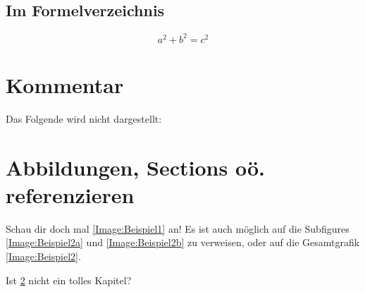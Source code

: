 \subsection{Im Formelverzeichnis}
\begin{equation}
	a^2+b^2=c^2
\end{equation}

\section{Kommentar}
Das Folgende wird nicht dargestellt: 

\section{Abbildungen, Sections oö. referenzieren}
\label{Section:cref}

Schau dir doch mal \cref{Image:Beispiel1} an!
Es ist auch möglich auf die Subfigures \cref{Image:Beispiel2a} und \cref{Image:Beispiel2b} zu verweisen, oder auf die Gesamtgrafik \cref{Image:Beispiel2}.

Ist \cref{Section:cref} nicht ein tolles Kapitel?

